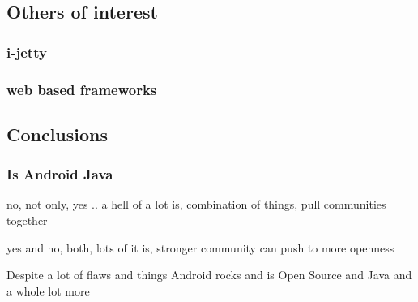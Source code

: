 \documentclass{beamer}
\begin{document}
\subsection{Others of interest} 

\begin{frame}
  \frametitle{i-jetty}
\end{frame}

\begin{frame}
  \frametitle{web based frameworks}
\end{frame}

\subsection{Conclusions}

\begin{frame}
  \frametitle{Is Android Java}
  no, not only, yes .. a hell of a lot is,
  combination of things, pull communities together
\end{frame}

\begin{frame}

yes and no, both, lots of it is, stronger community can push to more openness

\end{frame}

\begin{frame}

Despite a lot of flaws and things
Android rocks and is Open Source and Java and a whole lot more
\end{frame}
\end{document}
